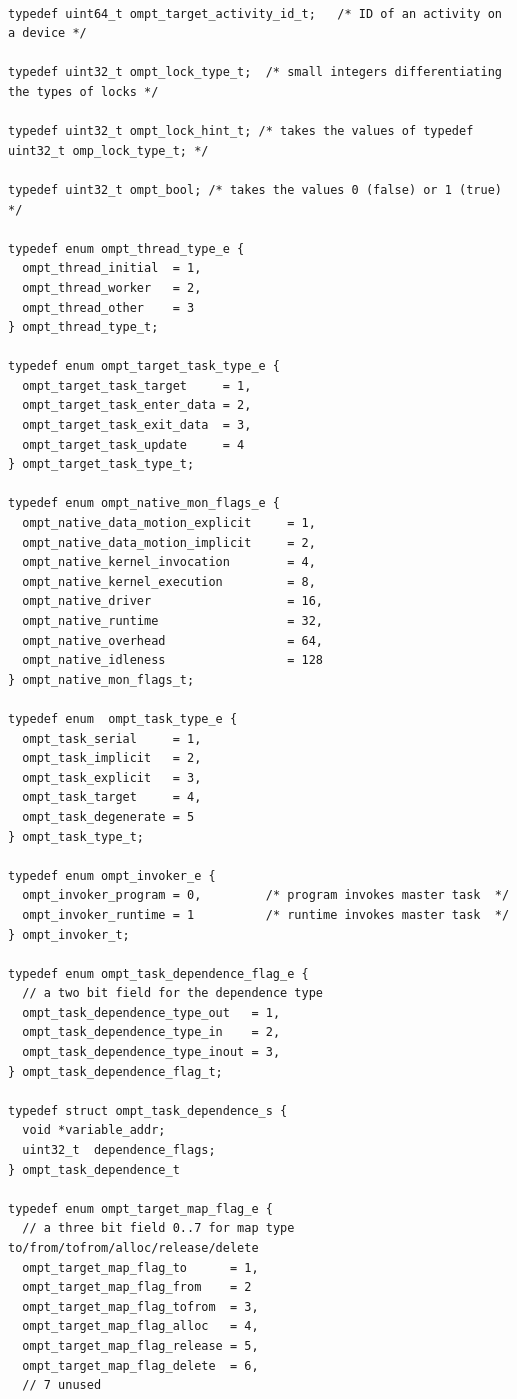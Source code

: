 \documentclass{article}
\begin{document}
{\begin{verbatim}

typedef uint64_t ompt_target_activity_id_t;   /* ID of an activity on a device */

typedef uint32_t ompt_lock_type_t;  /* small integers differentiating the types of locks */

typedef uint32_t ompt_lock_hint_t; /* takes the values of typedef uint32_t omp_lock_type_t; */

typedef uint32_t ompt_bool; /* takes the values 0 (false) or 1 (true) */

typedef enum ompt_thread_type_e {
  ompt_thread_initial  = 1,
  ompt_thread_worker   = 2,
  ompt_thread_other    = 3
} ompt_thread_type_t;

typedef enum ompt_target_task_type_e {
  ompt_target_task_target     = 1,
  ompt_target_task_enter_data = 2,
  ompt_target_task_exit_data  = 3,
  ompt_target_task_update     = 4
} ompt_target_task_type_t;

typedef enum ompt_native_mon_flags_e {
  ompt_native_data_motion_explicit     = 1,
  ompt_native_data_motion_implicit     = 2,
  ompt_native_kernel_invocation        = 4,
  ompt_native_kernel_execution         = 8,
  ompt_native_driver                   = 16,
  ompt_native_runtime                  = 32,
  ompt_native_overhead                 = 64,
  ompt_native_idleness                 = 128
} ompt_native_mon_flags_t;

typedef enum  ompt_task_type_e {
  ompt_task_serial     = 1,
  ompt_task_implicit   = 2,
  ompt_task_explicit   = 3,
  ompt_task_target     = 4,
  ompt_task_degenerate = 5
} ompt_task_type_t;

typedef enum ompt_invoker_e {
  ompt_invoker_program = 0,         /* program invokes master task  */
  ompt_invoker_runtime = 1          /* runtime invokes master task  */
} ompt_invoker_t;

typedef enum ompt_task_dependence_flag_e {
  // a two bit field for the dependence type
  ompt_task_dependence_type_out   = 1,
  ompt_task_dependence_type_in    = 2,
  ompt_task_dependence_type_inout = 3,
} ompt_task_dependence_flag_t;

typedef struct ompt_task_dependence_s {
  void *variable_addr;
  uint32_t  dependence_flags;
} ompt_task_dependence_t

typedef enum ompt_target_map_flag_e {
  // a three bit field 0..7 for map type to/from/tofrom/alloc/release/delete
  ompt_target_map_flag_to      = 1,
  ompt_target_map_flag_from    = 2
  ompt_target_map_flag_tofrom  = 3, 
  ompt_target_map_flag_alloc   = 4,
  ompt_target_map_flag_release = 5, 
  ompt_target_map_flag_delete  = 6, 
  // 7 unused


\end{verbatim}}
\end{document}
